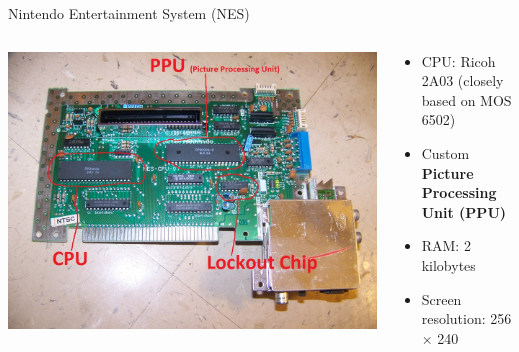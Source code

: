 \begin{frame}{Nintendo Entertainment System (NES)}
	\begin{columns}
		\begin{column}{0.32\textwidth}
			\includegraphics[width=\textwidth]{nes_motherboard}
		\end{column}
		\begin{column}{0.64\textwidth}
			\begin{itemize}
				\pause\item CPU: Ricoh 2A03 (closely based on MOS 6502)
				\pause\item Custom \textbf{Picture Processing Unit (PPU)}
				\pause\item RAM: 2 kilobytes
				\pause\item Screen resolution: 256 $\times$ 240
			\end{itemize}
		\end{column}
	\end{columns}
\end{frame}
